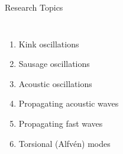 \documentclass[table]{beamer}
\begin{document}
\begin{frame}{Research Topics}
    \begin{columns}
        \column{0.5\paperwidth}
        \column{0.5\paperwidth}
        \begin{enumerate}
            \item Kink oscillations
            \item Sausage oscillations
            \item Acoustic oscillations
            \item Propagating acoustic waves
            \item Propagating fast waves
            \item Torsional (Alfv\'en) modes
        \end{enumerate}
    \end{columns}
\end{frame}%
\end{document}
